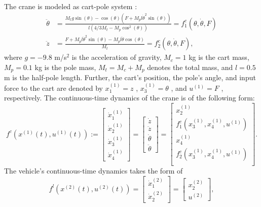 The crane is modeled as cart-pole system \cite{Barto1983}:
\begin{align*}
	\ddot{\theta} &= \frac{M_tg\sin(\theta) - \cos(\theta)(F + M_pl \dot{\theta}^2 \sin(\theta))}{l(4/3 M_t- M_p \cos^2(\theta))}=f^c_1(\theta,\dot{\theta},F)\\
	\ddot{z}&= \frac{F + M_pl \dot{\theta}^2 \sin(\theta)-M_pl \ddot{\theta} \cos(\theta)}{M_t}=f^c_2(\theta,\dot{\theta},F),
\end{align*}
where
	$g=-9.8$ m/s$^2$ is the acceleration of gravity,
	$M_c=1$ kg is the cart mass,
	$M_p=0.1$ kg is the pole mass,
	$M_t=M_c+M_p$ denotes the total mass,
and
	$l=0.5$ m is the half-pole length.
Further, the cart's position, the pole's angle, and input force to the cart are denoted by $x_1^{(1)}=z$ , $x_3^{(1)}=\theta$ , 
and $u^{(1)}=F$ , respectively. 
The continuous-time dynamics of the crane is of the following form:
\[f^{c}(x^{(1)}(t),u^{(1)}(t)):=\begin{bmatrix}
	\dot{x}_1^{(1)}\\
	\dot{x}_2^{(1)}\\
	\dot{x}_3^{(1)}\\
	\dot{x}_4^{(1)}
\end{bmatrix}=\begin{bmatrix}
\dot{z}\\
\ddot{z}\\
\dot{\theta}\\
\ddot{\theta}
\end{bmatrix}=
\begin{bmatrix}
	x_2^{(1)}\\
	f^c_1(x_3^{(1)},x_4^{(1)},u^{(1)})\\
	x_4^{(1)}\\
	f^c_2(x_3^{(1)},x_4^{(1)},u^{(1)})\\
\end{bmatrix}.\]
The vehicle's continuous-time dynamics takes the form of
\[f^{l}(x^{(2)}(t),u^{(2)}(t))=\begin{bmatrix}
\dot{x}_1^{(2)}\\ \dot{x}^{(2)}_2 \end{bmatrix}=\begin{bmatrix} x^{(2)}_2\\ u^{(2)} \end{bmatrix},
\]
